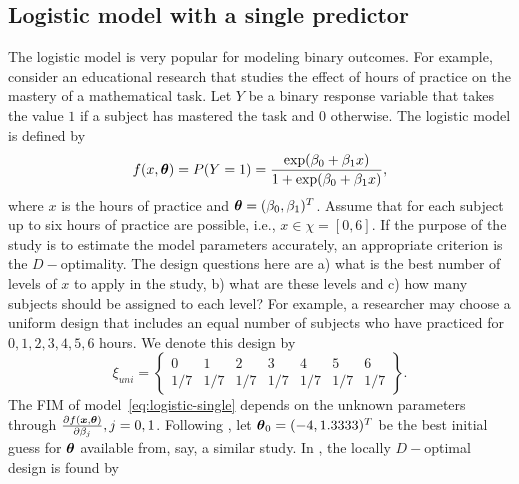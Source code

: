 \subsection{ Logistic model with a single predictor}
\label{sec:logsitc-single}
The logistic model is very popular for modeling binary outcomes. For example, consider  an educational research that studies the effect of hours of practice on the mastery of a mathematical task. Let  $Y$ be a binary response variable that  takes the value $1$ if a subject  has mastered the  task and $0$ otherwise. The logistic model is defined by
\begin{equation}
\label{eq:logistic-single}
f(x, \boldsymbol{\theta}) =  P(Y=1) = \frac{\exp(\beta_0 + \beta_1 x)}{1 + \exp(\beta_0 + \beta_1  x)},
\end{equation}
where $x$ is the hours of practice and $\boldsymbol{\theta} = (\beta_0, \beta_1)^T$.   Assume that  for each subject  up to six  hours of practice are possible, i.e., $x \in \chi = [0, 6]$. If  the purpose of the study is to estimate the model parameters accurately, an appropriate criterion is the  $D-$optimality.
The design questions here are a) what is the best number of levels of $x$ to  apply in the study, b) what are these levels  and c) how many subjects  should be  assigned to each level? For example, a researcher may choose a uniform design that  includes an equal number of subjects who have practiced for $0, 1, 2, 3, 4, 5, 6$ hours. We denote this design by
\begin{equation}
\label{eq-uniform-design}
\xi_{uni} =
  \left\{
    \begin{array}{ccccccc}
    0 & 1 & 2 & 3 & 4 & 5 & 6 \\
    1/7& 1/7 & 1/7& 1/7 & 1/7 & 1/7 & 1/7
    \end{array}
    \right\}.
\end{equation}
The FIM of  model~\eqref{eq:logistic-single} depends on the unknown parameters through $\frac{\partial f(\boldsymbol{x},\boldsymbol{\theta})}{\partial \beta_j}, j = 0, 1$.
Following \citet{bergerwong2005},  let $\boldsymbol{\theta}_0 = (-4, 1.3333)^T$ be the best initial guess for $\boldsymbol{\theta}$ available from, say, a similar study.   In , the  locally $D-$optimal design is found by
